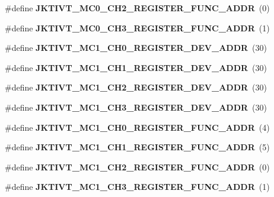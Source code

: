 \begin{DoxyCompactItemize}
\item 
\#define {\bfseries J\+K\+T\+I\+V\+T\+\_\+\+M\+C0\+\_\+\+C\+H2\+\_\+\+R\+E\+G\+I\+S\+T\+E\+R\+\_\+\+F\+U\+N\+C\+\_\+\+A\+D\+D\+R}~(0)\label{types_8h_a91b1ef7fb933a2d9892afed9875761bf}

\item 
\#define {\bfseries J\+K\+T\+I\+V\+T\+\_\+\+M\+C0\+\_\+\+C\+H3\+\_\+\+R\+E\+G\+I\+S\+T\+E\+R\+\_\+\+F\+U\+N\+C\+\_\+\+A\+D\+D\+R}~(1)\label{types_8h_a1ef7141e216b11f2631a8ac995a34236}

\item 
\#define {\bfseries J\+K\+T\+I\+V\+T\+\_\+\+M\+C1\+\_\+\+C\+H0\+\_\+\+R\+E\+G\+I\+S\+T\+E\+R\+\_\+\+D\+E\+V\+\_\+\+A\+D\+D\+R}~(30)\label{types_8h_af559def4c09229197e66cf5960f1aa02}

\item 
\#define {\bfseries J\+K\+T\+I\+V\+T\+\_\+\+M\+C1\+\_\+\+C\+H1\+\_\+\+R\+E\+G\+I\+S\+T\+E\+R\+\_\+\+D\+E\+V\+\_\+\+A\+D\+D\+R}~(30)\label{types_8h_a4fc17fd8b24d3435e67d64038f4362a3}

\item 
\#define {\bfseries J\+K\+T\+I\+V\+T\+\_\+\+M\+C1\+\_\+\+C\+H2\+\_\+\+R\+E\+G\+I\+S\+T\+E\+R\+\_\+\+D\+E\+V\+\_\+\+A\+D\+D\+R}~(30)\label{types_8h_a6abd14f082080e93b497faea32db10a4}

\item 
\#define {\bfseries J\+K\+T\+I\+V\+T\+\_\+\+M\+C1\+\_\+\+C\+H3\+\_\+\+R\+E\+G\+I\+S\+T\+E\+R\+\_\+\+D\+E\+V\+\_\+\+A\+D\+D\+R}~(30)\label{types_8h_a5e3e78fbf78ab646158d0cbfcd56c876}

\item 
\#define {\bfseries J\+K\+T\+I\+V\+T\+\_\+\+M\+C1\+\_\+\+C\+H0\+\_\+\+R\+E\+G\+I\+S\+T\+E\+R\+\_\+\+F\+U\+N\+C\+\_\+\+A\+D\+D\+R}~(4)\label{types_8h_aa713c04c5c8e574b43e0d6d6fa96be7e}

\item 
\#define {\bfseries J\+K\+T\+I\+V\+T\+\_\+\+M\+C1\+\_\+\+C\+H1\+\_\+\+R\+E\+G\+I\+S\+T\+E\+R\+\_\+\+F\+U\+N\+C\+\_\+\+A\+D\+D\+R}~(5)\label{types_8h_a59d01471d69423a214dc8db3519af3de}

\item 
\#define {\bfseries J\+K\+T\+I\+V\+T\+\_\+\+M\+C1\+\_\+\+C\+H2\+\_\+\+R\+E\+G\+I\+S\+T\+E\+R\+\_\+\+F\+U\+N\+C\+\_\+\+A\+D\+D\+R}~(0)\label{types_8h_ab8abdd8a242a3a1314fb5b30d2b9b613}

\item 
\#define {\bfseries J\+K\+T\+I\+V\+T\+\_\+\+M\+C1\+\_\+\+C\+H3\+\_\+\+R\+E\+G\+I\+S\+T\+E\+R\+\_\+\+F\+U\+N\+C\+\_\+\+A\+D\+D\+R}~(1)\label{types_8h_a42da512eaa955bd9aea434ad49a363d6}


\end{DoxyCompactItemize}
